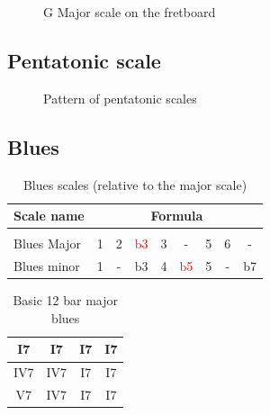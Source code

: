 \documentclass{article}
\begin{document}
\begin{figure}[h!]
	\centering
	\hspace*{-2cm}
	\scalebox{0.5}{}
	\caption{G Major scale on the fretboard}
	\label{fig:gamme_majeure_manche}
\end{figure}

\newpage
\subsection{Pentatonic scale}

\begin{figure}[h!]
	\centering
	\hspace*{-2cm}
	\scalebox{0.5}{}
	\caption{Pattern of pentatonic scales}
	\label{fig:gammme_penta_manche}
\end{figure}

\newpage
\subsection{Blues}


\begin{table}[!h]
	\caption{Blues scales (relative to the major scale)}
	\centering
	\begin{tabular}{l|cccccccc}
		Scale name  & \multicolumn{8}{c}{Formula} \\
		\hline \hline \vspace{-0.4cm} \\
		Blues Major   & 1 & 2  & \textcolor{red}{b3} & 3  &   -   & 5  & 6  &  -  \\
		Blues minor   & 1 &  - & b3 & 4  & \textcolor{red}{b5} &  5  & - &  b7 \\
	\end{tabular}
	\label{tab: }
\end{table}

\begin{table}[!h]
	\caption{Basic 12 bar major blues}
	\centering
	\begin{tabular}{| c | c | c | c |}
		\hline
		\phantom{x}I7\phantom{x} & \phantom{x}I7\phantom{x} & \phantom{x}I7\phantom{x} & \phantom{x}I7\phantom{x}  \\
		\hline
		\phantom{x}IV7\phantom{x} & \phantom{x}IV7\phantom{x} & \phantom{x}I7\phantom{x} & \phantom{x}I7\phantom{x}  \\
		\hline
		\phantom{x}V7\phantom{x} & \phantom{x}IV7\phantom{x} & \phantom{x}I7\phantom{x} & \phantom{x}I7\phantom{x}  \\
		\hline
	\end{tabular}
	\label{tab: }
\end{table}
\end{document}
